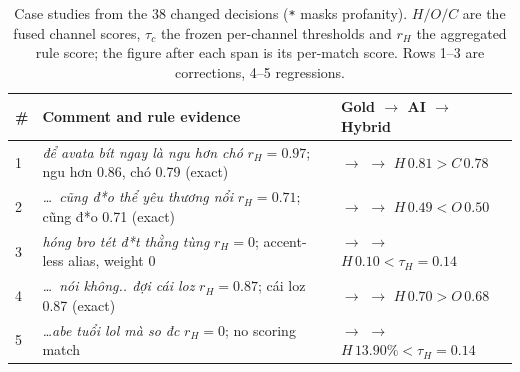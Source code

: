 ﻿\begin{table}[ht]
\centering
\scriptsize
\setlength{\tabcolsep}{3pt}
\renewcommand{\arraystretch}{1.0}
\caption{Case studies from the 38 changed decisions (\texttt{*} masks profanity).
$H/O/C$ are the fused channel scores, $\tau_c$ the frozen per-channel thresholds and
$r_H$ the aggregated \hate{} rule score; the figure after each span is its per-match
score. Rows 1--3 are corrections, 4--5 regressions.}
\label{tab:cases}
\begin{tabularx}{\textwidth}{@{}l>{\raggedright\arraybackslash}p{6.3cm}>{\raggedright\arraybackslash}X@{}}
\toprule
\# & Comment and rule evidence & Gold $\to$ AI $\to$ Hybrid \\
\midrule
1 & \emph{để avata bít ngay là ngu hơn chó} \newline $r_H{=}0.97$; ngu hơn 0.86, chó 0.79 (exact)
  & \hate{} $\to$ \clean{} $\to$ \hate{} \newline $H\,0.81 > C\,0.78$ \\
2 & \emph{\dots\ cũng đ*o thể yêu thương nổi} \newline $r_H{=}0.71$; cũng đ*o 0.71 (exact)
  & \hate{} $\to$ \off{} $\to$ \hate{} \newline $H\,0.49 < O\,0.50$ \\
3 & \emph{hóng bro tét đ*t thằng tùng} \newline $r_H{=}0$; accent-less alias, weight 0
  & \clean{} $\to$ \hate{} $\to$ \clean{} \newline $H\,0.10 < \tau_H{=}0.14$ \\
\midrule
4 & \emph{\dots\ nói không.. đợi cái loz} \newline $r_H{=}0.87$; cái loz 0.87 (exact)
  & \off{} $\to$ \off{} $\to$ \hate{} \newline $H\,0.70 > O\,0.68$ \\
5 & \emph{\dots abe tuổi lol mà so đc} \newline $r_H{=}0$; no scoring match
  & \hate{} $\to$ \hate{} $\to$ \clean{} \newline $H\,13.90\% < \tau_H{=}0.14$ \\
\bottomrule
\end{tabularx}
\end{table}
